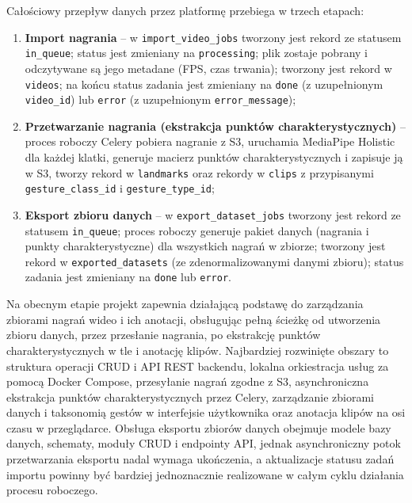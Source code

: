 Całościowy przepływ danych przez platformę przebiega w trzech etapach:

\begin{enumerate}
  \item \textbf{Import nagrania} -- w \texttt{import\_video\_jobs} tworzony jest
        rekord ze statusem \texttt{in\_queue}; status jest zmieniany na
        \texttt{processing}; plik zostaje pobrany i odczytywane są jego metadane
        (FPS, czas trwania); tworzony jest rekord w \texttt{videos}; na końcu
        status zadania jest zmieniany na \texttt{done} (z uzupełnionym
        \texttt{video\_id}) lub \texttt{error} (z uzupełnionym
        \texttt{error\_message});
  \item \textbf{Przetwarzanie nagrania (ekstrakcja punktów charakterystycznych)}
        -- proces roboczy Celery pobiera nagranie z S3, uruchamia MediaPipe
        Holistic dla każdej klatki, generuje macierz punktów charakterystycznych
        i zapisuje ją w S3, tworzy rekord w \texttt{landmarks} oraz rekordy
        w \texttt{clips} z przypisanymi \texttt{gesture\_class\_id}
        i \texttt{gesture\_type\_id};
  \item \textbf{Eksport zbioru danych} -- w \texttt{export\_dataset\_jobs}
        tworzony jest rekord ze statusem \texttt{in\_queue}; proces roboczy
        generuje pakiet danych (nagrania i punkty charakterystyczne) dla
        wszystkich nagrań w zbiorze; tworzony jest rekord
        w \texttt{exported\_datasets} (ze zdenormalizowanymi danymi zbioru);
        status zadania jest zmieniany na \texttt{done} lub \texttt{error}.
\end{enumerate}

Na obecnym etapie projekt zapewnia działającą podstawę do zarządzania zbiorami
nagrań wideo i ich anotacji, obsługując pełną ścieżkę od utworzenia zbioru danych,
przez przesłanie nagrania, po ekstrakcję punktów charakterystycznych w tle
 i anotację klipów. Najbardziej rozwinięte obszary to struktura operacji CRUD
 i API REST backendu, lokalna orkiestracja usług za pomocą Docker Compose,
przesyłanie nagrań zgodne z S3, asynchroniczna ekstrakcja punktów
charakterystycznych przez Celery, zarządzanie zbiorami danych i taksonomią gestów
w interfejsie użytkownika oraz anotacja klipów na osi czasu w przeglądarce.
Obsługa eksportu zbiorów danych obejmuje modele bazy danych, schematy, moduły CRUD
 i endpointy API, jednak asynchroniczny potok przetwarzania eksportu nadal wymaga
ukończenia, a aktualizacje statusu zadań importu powinny być bardziej jednoznacznie
realizowane w całym cyklu działania procesu roboczego.

